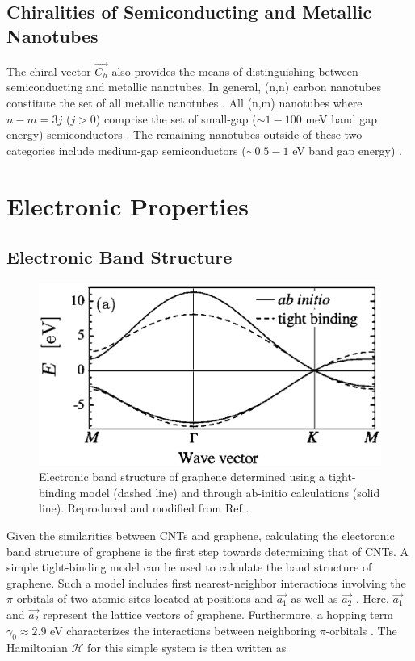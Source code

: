 \subsection{Chiralities of Semiconducting and Metallic Nanotubes}
The chiral vector $\vec{C_h}$ also provides the means of distinguishing between semiconducting and metallic nanotubes. In general, (n,n) carbon nanotubes constitute the set of all metallic nanotubes \cite{nanot2012optoelectronic}. All (n,m) nanotubes where $n-m = 3j$ ($j > 0$) comprise the set of small-gap ($\sim1 - 100$ meV band gap energy) semiconductors \cite{nanot2012optoelectronic}. The remaining nanotubes outside of these two categories include medium-gap semiconductors ($\sim0.5 - 1$ eV band gap energy) \cite{nanot2012optoelectronic}.


\section{Electronic Properties}

\subsection{Electronic Band Structure}


\begin{figure}[h]
	\centering
	\includegraphics[scale=0.5]{images/chapter_optical_props/graphene_band_charlier}
	\caption{Electronic band structure of graphene determined using a tight-binding model (dashed line) and through ab-initio calculations (solid line). Reproduced and modified from Ref \cite{reich2002tight}.}
	\label{fig:graphene_band}
\end{figure}

Given the similarities between CNTs and graphene, calculating the electoronic band structure of graphene is the first step towards determining that of CNTs. A simple tight-binding model can be used to calculate the band structure of graphene. Such a model includes first nearest-neighbor interactions involving the $\pi$-orbitals of two atomic sites located at positions and $\vec{a_1}$ as well as $\vec{a_2}$ \cite{charlier2007electronic}. Here, $\vec{a_1}$ and $\vec{a_2}$ represent the lattice vectors of graphene. Furthermore, a hopping term $\gamma_0 \approx 2.9$ eV  characterizes the interactions between neighboring $\pi$-orbitals \cite{charlier2007electronic}. The Hamiltonian $\mathcal{H}$ for this simple system is then written as 


